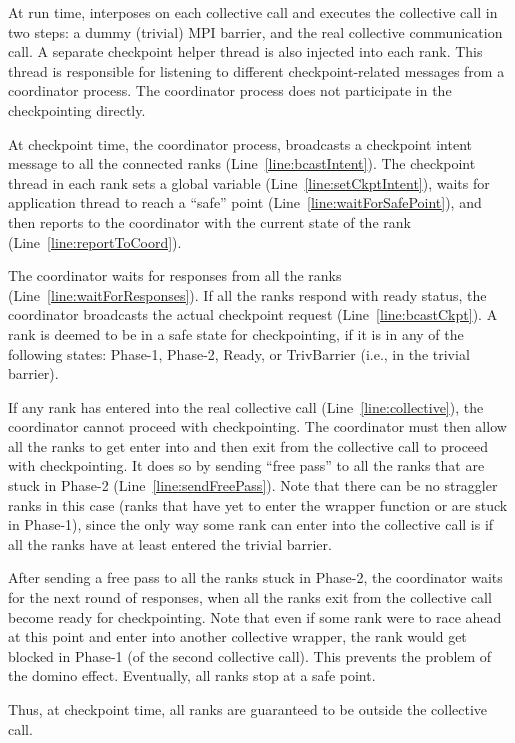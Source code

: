 \documentclass[11pt,letter]{article}
\begin{document}
 At run time, \mpiSol{} interposes on each collective call and executes the
 collective call in two steps: a dummy (trivial) MPI barrier, and the real
 collective communication call. A separate checkpoint helper thread is also
 injected into each rank. This thread is responsible for listening to different
 checkpoint-related messages from a coordinator process. The coordinator
 process does not participate in the checkpointing directly.

 At checkpoint time, the coordinator process, broadcasts a checkpoint intent
 message to all the connected ranks (Line~\ref{line:bcastIntent}). The
 checkpoint thread in each rank sets a global variable
 (Line~\ref{line:setCkptIntent}), waits for application thread to reach a
 ``safe'' point (Line~\ref{line:waitForSafePoint}), and then reports to the
 coordinator with the current state of the rank (Line~\ref{line:reportToCoord}).

 The coordinator waits for responses from all the ranks
 (Line~\ref{line:waitForResponses}). If all the ranks respond with ready
 status, the coordinator broadcasts the actual checkpoint
 request (Line~\ref{line:bcastCkpt}). A rank is deemed to be in a safe state for
 checkpointing, if it is in any of the following states: Phase-1, Phase-2,
 Ready, or TrivBarrier (i.e., in the trivial barrier).

 If any rank has entered into the real collective call
 (Line~\ref{line:collective}), the coordinator cannot proceed with
 checkpointing.  The coordinator must then allow all the ranks to get enter into
 and then exit from the collective call to proceed with checkpointing.
 It does so by sending ``free pass'' to all the ranks that are stuck in Phase-2
 (Line~\ref{line:sendFreePass}). Note that there
 can be no straggler ranks in this case (ranks that have yet to enter the
 wrapper function or are stuck in Phase-1), since the only way some rank can
 enter into the collective call is if all the ranks have at least entered
 the trivial barrier.

 After sending a free pass to all the ranks stuck in Phase-2, the coordinator
 waits for the next round of responses, when all the ranks exit from the
 collective call become ready for checkpointing. Note that even if some
 rank were to race ahead at this point and enter into another collective
 wrapper, the rank would get blocked in Phase-1 (of the second collective call).
 This prevents the problem of the domino effect. Eventually, all ranks stop at
 a safe point.

 Thus, at checkpoint time, all ranks are guaranteed to be outside the
 collective call.
\end{document}

